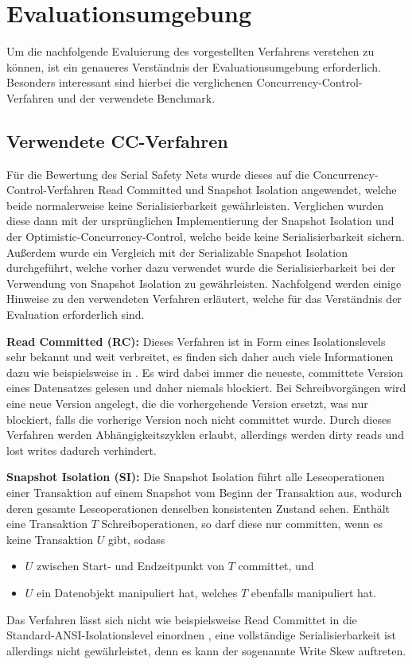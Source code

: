 \section{Evaluationsumgebung}
Um die nachfolgende Evaluierung des vorgestellten Verfahrens verstehen zu können, ist ein genaueres Verständnis der Evaluationsumgebung erforderlich.
Besonders interessant sind hierbei die verglichenen Concurrency-Control-Verfahren und der verwendete Benchmark.

\subsection{Verwendete CC-Verfahren}
Für die Bewertung des Serial Safety Nets wurde dieses auf die Concurrency-Control-Verfahren Read Committed und Snapshot Isolation angewendet, welche beide normalerweise keine Serialisierbarkeit gewährleisten.
Verglichen wurden diese dann mit der ursprünglichen Implementierung der Snapshot Isolation und der Optimistic-Concurrency-Control, welche beide keine Serialisierbarkeit sichern.
Außerdem wurde ein Vergleich mit der Serializable Snapshot Isolation durchgeführt, welche vorher dazu verwendet wurde die Serialisierbarkeit bei der Verwendung von Snapshot Isolation zu gewährleisten.
Nachfolgend werden einige Hinweise zu den verwendeten Verfahren erläutert, welche für das Verständnis der Evaluation erforderlich sind.

\textbf{Read Committed (RC):} Dieses Verfahren ist in Form eines Isolationslevels sehr bekannt und weit verbreitet, es finden sich daher auch viele Informationen dazu wie beispielsweise in \cite{Berenson:1995}.
Es wird dabei immer die neueste, committete Version eines Datensatzes gelesen und daher niemals blockiert.
Bei Schreibvorgängen wird eine neue Version angelegt, die die vorhergehende Version ersetzt, was nur blockiert, falls die vorherige Version noch nicht committet wurde.
Durch dieses Verfahren werden Abhängigkeitszyklen erlaubt, allerdings werden dirty reads und lost writes \cite{Berenson:1995} dadurch verhindert.

\textbf{Snapshot Isolation (SI):} Die Snapshot Isolation führt alle Leseoperationen einer Transaktion auf einem Snapshot vom Beginn der Transaktion aus, wodurch deren gesamte Leseoperationen denselben konsistenten Zustand sehen.
Enthält eine Transaktion $T$ Schreiboperationen, so darf diese nur committen, wenn es keine Transaktion $U$ gibt, sodass 
\begin{itemize}
	\item $U$ zwischen Start- und Endzeitpunkt von $T$ committet, und
	\item $U$ ein Datenobjekt manipuliert hat, welches $T$ ebenfalls manipuliert hat.
\end{itemize}
Das Verfahren lässt sich nicht wie beispielsweise Read Committet in die Standard-ANSI-Isolationslevel einordnen \cite{Adya:2000}, eine vollständige Serialisierbarkeit ist allerdings nicht gewährleistet, denn es kann der sogenannte Write Skew auftreten.


